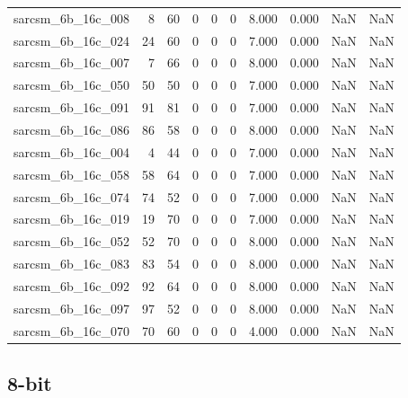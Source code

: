 \documentclass{article}
\begin{document}
\begin{longtable}{lrrrrrrrrr}
sarcsm\_6b\_16c\_008 & 8 & 60 & 0 & 0 & 0 & 8.000 & 0.000 & NaN & NaN \\
sarcsm\_6b\_16c\_024 & 24 & 60 & 0 & 0 & 0 & 7.000 & 0.000 & NaN & NaN \\
sarcsm\_6b\_16c\_007 & 7 & 66 & 0 & 0 & 0 & 8.000 & 0.000 & NaN & NaN \\
sarcsm\_6b\_16c\_050 & 50 & 50 & 0 & 0 & 0 & 7.000 & 0.000 & NaN & NaN \\
sarcsm\_6b\_16c\_091 & 91 & 81 & 0 & 0 & 0 & 7.000 & 0.000 & NaN & NaN \\
sarcsm\_6b\_16c\_086 & 86 & 58 & 0 & 0 & 0 & 8.000 & 0.000 & NaN & NaN \\
sarcsm\_6b\_16c\_004 & 4 & 44 & 0 & 0 & 0 & 7.000 & 0.000 & NaN & NaN \\
sarcsm\_6b\_16c\_058 & 58 & 64 & 0 & 0 & 0 & 7.000 & 0.000 & NaN & NaN \\
sarcsm\_6b\_16c\_074 & 74 & 52 & 0 & 0 & 0 & 7.000 & 0.000 & NaN & NaN \\
sarcsm\_6b\_16c\_019 & 19 & 70 & 0 & 0 & 0 & 7.000 & 0.000 & NaN & NaN \\
sarcsm\_6b\_16c\_052 & 52 & 70 & 0 & 0 & 0 & 8.000 & 0.000 & NaN & NaN \\
sarcsm\_6b\_16c\_083 & 83 & 54 & 0 & 0 & 0 & 8.000 & 0.000 & NaN & NaN \\
sarcsm\_6b\_16c\_092 & 92 & 64 & 0 & 0 & 0 & 8.000 & 0.000 & NaN & NaN \\
sarcsm\_6b\_16c\_097 & 97 & 52 & 0 & 0 & 0 & 8.000 & 0.000 & NaN & NaN \\
sarcsm\_6b\_16c\_070 & 70 & 60 & 0 & 0 & 0 & 4.000 & 0.000 & NaN & NaN \\
\end{longtable}

\subsection*{8-bit}
\end{document}
